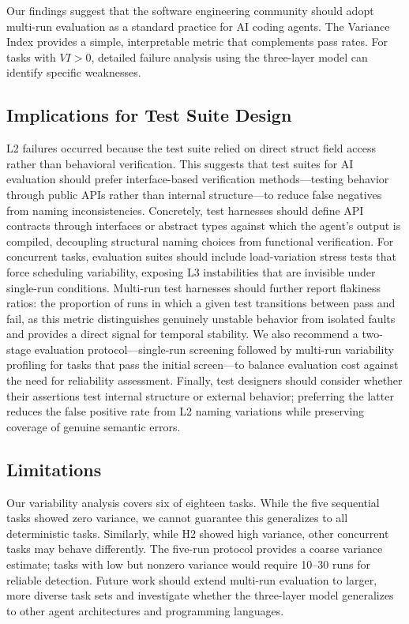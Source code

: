 \documentclass[conference]{IEEEtran}
\begin{document}
Our findings suggest that the software engineering community should adopt multi-run evaluation as a standard practice for AI coding agents.
The Variance Index provides a simple, interpretable metric that complements pass rates.
For tasks with $VI > 0$, detailed failure analysis using the three-layer model can identify specific weaknesses.

\subsection{Implications for Test Suite Design}

L2 failures occurred because the test suite relied on direct struct field access rather than behavioral verification.
This suggests that test suites for AI evaluation should prefer interface-based verification methods---testing behavior through public APIs rather than internal structure---to reduce false negatives from naming inconsistencies.
Concretely, test harnesses should define API contracts through interfaces or abstract types against which the agent's output is compiled, decoupling structural naming choices from functional verification.
For concurrent tasks, evaluation suites should include load-variation stress tests that force scheduling variability, exposing L3 instabilities that are invisible under single-run conditions.
Multi-run test harnesses should further report flakiness ratios: the proportion of runs in which a given test transitions between pass and fail, as this metric distinguishes genuinely unstable behavior from isolated faults and provides a direct signal for temporal stability.
We also recommend a two-stage evaluation protocol---single-run screening followed by multi-run variability profiling for tasks that pass the initial screen---to balance evaluation cost against the need for reliability assessment.
Finally, test designers should consider whether their assertions test internal structure or external behavior; preferring the latter reduces the false positive rate from L2 naming variations while preserving coverage of genuine semantic errors.

\subsection{Limitations}

Our variability analysis covers six of eighteen tasks.
While the five sequential tasks showed zero variance, we cannot guarantee this generalizes to all deterministic tasks.
Similarly, while H2 showed high variance, other concurrent tasks may behave differently.
The five-run protocol provides a coarse variance estimate; tasks with low but nonzero variance would require 10--30 runs for reliable detection.
Future work should extend multi-run evaluation to larger, more diverse task sets and investigate whether the three-layer model generalizes to other agent architectures and programming languages.
\end{document}
